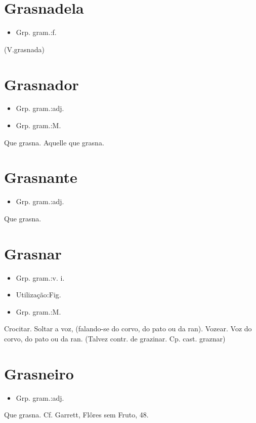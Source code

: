 \section{Grasnadela}
\begin{itemize}
\item {Grp. gram.:f.}
\end{itemize}
(V.grasnada)
\section{Grasnador}
\begin{itemize}
\item {Grp. gram.:adj.}
\end{itemize}
\begin{itemize}
\item {Grp. gram.:M.}
\end{itemize}
Que grasna.
Aquelle que grasna.
\section{Grasnante}
\begin{itemize}
\item {Grp. gram.:adj.}
\end{itemize}
Que grasna.
\section{Grasnar}
\begin{itemize}
\item {Grp. gram.:v. i.}
\end{itemize}
\begin{itemize}
\item {Utilização:Fig.}
\end{itemize}
\begin{itemize}
\item {Grp. gram.:M.}
\end{itemize}
Crocitar.
Soltar a voz, (falando-se do corvo, do pato ou da ran).
Vozear.
Voz do corvo, do pato ou da ran.
(Talvez contr. de \textunderscore grazinar\textunderscore . Cp. cast. \textunderscore graznar\textunderscore )
\section{Grasneiro}
\begin{itemize}
\item {Grp. gram.:adj.}
\end{itemize}
Que grasna. Cf. Garrett, \textunderscore Flôres sem Fruto\textunderscore , 48.
